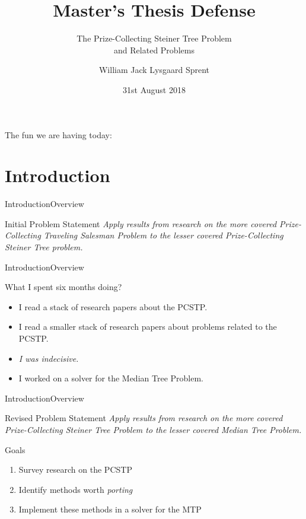 \documentclass[rgb,dvipsnames]{beamer}
\title{Master's Thesis Defense}
\subtitle{The Prize-Collecting Steiner Tree Problem
  \\and Related Problems}
\author{William Jack Lysgaard Sprent}
\date{31st August 2018}
\institute{DIKU \\ University of Copenhagen}
\begin{document}
 
\frame{\titlepage}

\begin{frame}{The fun we are having today:}
\tableofcontents
\end{frame}

\section{Introduction}

\begin{frame}{Introduction}{Overview}
  \begin{block}{Initial Problem Statement}
    \textit{Apply results from research on the more covered Prize-Collecting Traveling Salesman
    Problem to the lesser covered Prize-Collecting Steiner Tree problem.}
  \end{block}
\end{frame}

\begin{frame}{Introduction}{Overview}
  \begin{block}{What I spent six months doing?}
  \pause
  \begin{itemize}
  \item I read a stack of research papers about the PCSTP.
  \item I read a smaller stack of research papers about problems related to the PCSTP. \pause
  \item \textit{I was indecisive.} \pause
  \item I worked on a solver for the Median Tree Problem.
  \end{itemize}
\end{block}
\end{frame}

\begin{frame}{Introduction}{Overview}
  \begin{block}{Revised Problem Statement}
    \textit{Apply results from research on the more covered Prize-Collecting Steiner Tree
    Problem to the lesser covered Median Tree Problem.}
   \end{block}
   \begin{block}{Goals}
     \begin{enumerate}
     \item Survey research on the PCSTP
     \item Identify methods worth \textit{porting}
     \item Implement these methods in a solver for the MTP
     \end{enumerate}
   \end{block}
\end{frame}
\end{document}
